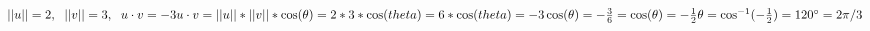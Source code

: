\subsection{}
\begin{math}
	||u||=2,
	\hspace{6px}
	||v||=3,
	\hspace{6px}
	u\cdot v=-3
	\\
	u\cdot v
	=||u||*||v||*\cos(\theta)
	=2*3*\cos(theta)
	=6*\cos(theta)
	=-3
	\\
	\cos(\theta)=-\frac{3}{6}
	=\cos(\theta)=-\frac{1}{2}
	\\
	\theta
	=\cos^{-1}(-\frac{1}{2})
	=120^{\circ}
	=2\pi/3
\end{math}